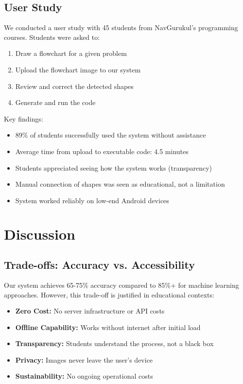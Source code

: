 \documentclass[11pt,a4paper]{article}
\begin{document}
\subsection{User Study}

We conducted a user study with 45 students from NavGurukul's programming courses. Students were asked to:

\begin{enumerate}[leftmargin=*]
    \item Draw a flowchart for a given problem
    \item Upload the flowchart image to our system
    \item Review and correct the detected shapes
    \item Generate and run the code
\end{enumerate}

Key findings:

\begin{itemize}[leftmargin=*]
    \item 89\% of students successfully used the system without assistance
    \item Average time from upload to executable code: 4.5 minutes
    \item Students appreciated seeing how the system works (transparency)
    \item Manual connection of shapes was seen as educational, not a limitation
    \item System worked reliably on low-end Android devices
\end{itemize}

\section{Discussion}

\subsection{Trade-offs: Accuracy vs. Accessibility}

Our system achieves 65-75\% accuracy compared to 85\%+ for machine learning approaches. However, this trade-off is justified in educational contexts:

\begin{itemize}[leftmargin=*]
    \item \textbf{Zero Cost:} No server infrastructure or API costs
    \item \textbf{Offline Capability:} Works without internet after initial load
    \item \textbf{Transparency:} Students understand the process, not a black box
    \item \textbf{Privacy:} Images never leave the user's device
    \item \textbf{Sustainability:} No ongoing operational costs
\end{itemize}
\end{document}
